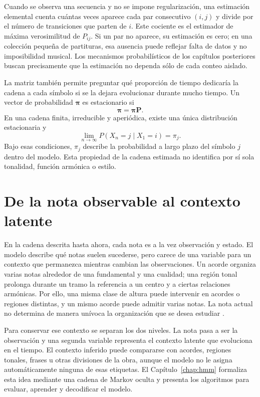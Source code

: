 Cuando se observa una secuencia y no se impone regularización, una estimación elemental cuenta cuántas veces aparece cada par consecutivo $(i,j)$ y divide por el número de transiciones que parten de $i$. Este cociente es el estimador de máxima verosimilitud de $P_{ij}$. Si un par no aparece, su estimación es cero; en una colección pequeña de partituras, esa ausencia puede reflejar falta de datos y no imposibilidad musical. Los mecanismos probabilísticos de los capítulos posteriores buscan precisamente que la estimación no dependa sólo de cada conteo aislado.

La matriz también permite preguntar qué proporción de tiempo dedicaría la cadena a cada símbolo si se la dejara evolucionar durante mucho tiempo. Un vector de probabilidad $\boldsymbol{\pi}$ es estacionario si
\[
\boldsymbol{\pi}=\boldsymbol{\pi}\mathbf{P}.
\]
En una cadena finita, irreducible y aperiódica, existe una única distribución estacionaria y
\[
\lim_{n\to\infty}P(X_n=j\mid X_1=i)=\pi_j.
\]
Bajo esas condiciones, $\pi_j$ describe la probabilidad a largo plazo del símbolo $j$ dentro del modelo. Esta propiedad de la cadena estimada no identifica por sí sola tonalidad, función armónica o estilo.

\section{De la nota observable al contexto latente}

En la cadena descrita hasta ahora, cada nota es a la vez observación y estado. El modelo describe qué notas suelen sucederse, pero carece de una variable para un contexto que permanezca mientras cambian las observaciones. Un acorde organiza varias notas alrededor de una fundamental y una cualidad; una región tonal prolonga durante un tramo la referencia a un centro y a ciertas relaciones armónicas. Por ello, una misma clase de altura puede intervenir en acordes o regiones distintas, y un mismo acorde puede admitir varias notas. La nota actual no determina de manera unívoca la organización que se desea estudiar \cite{temperley2007}.

Para conservar ese contexto se separan los dos niveles. La nota pasa a ser la observación y una segunda variable representa el contexto latente que evoluciona en el tiempo. El contexto inferido puede compararse con acordes, regiones tonales, frases u otras divisiones de la obra, aunque el modelo no le asigna automáticamente ninguna de esas etiquetas. El Capítulo~\ref{chap:hmm} formaliza esta idea mediante una cadena de Markov oculta y presenta los algoritmos para evaluar, aprender y decodificar el modelo.

